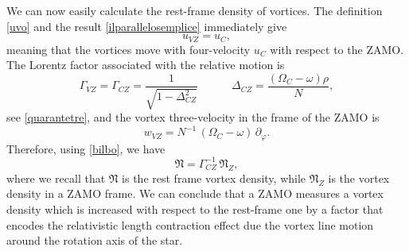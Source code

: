 \documentclass[usenatbib%
]{mnras}
\newcommand{\spc}{\quad \quad \quad}
\begin{document}
We can now easily calculate the rest-frame density of vortices. The definition \eqref{uvo} and the result \eqref{ilparallelosemplice} immediately give
\begin{equation}
u_{VZ} = u_C,
\end{equation}
meaning that the vortices move with four-velocity $u_C$ with respect to the ZAMO. 
The Lorentz factor associated with the relative motion is
\begin{equation}
\Gamma_{VZ} =\Gamma_{CZ} = \dfrac{1}{\sqrt{1 - \Delta_{CZ}^2}} 
 \spc 
  \Delta_{CZ} = \dfrac{(\Omega_C - \omega) \rho}{N},
\end{equation}
see \eqref{quarantetre}, and the vortex three-velocity in the frame of the ZAMO is
\begin{equation}
w_{VZ} = N^{-1} \, (\Omega_C - \omega) \, \partial_\varphi.
\end{equation}
Therefore, using \eqref{bilbo}, we have
\begin{equation}\label{zzzzzzzzzzzzzzzzzzzzzzz}
\mathfrak{N} = \Gamma_{CZ}^{-1} \, \mathfrak{N}_Z,
\end{equation}
where we recall that $\mathfrak{N}$ is the rest frame vortex density, while $\mathfrak{N}_Z$ is the vortex density in a ZAMO frame.
We can conclude that a ZAMO measures a vortex density which is increased with respect to the rest-frame one by a factor that encodes the relativistic length contraction effect due the vortex line motion around the rotation axis of the star.

\end{document}
